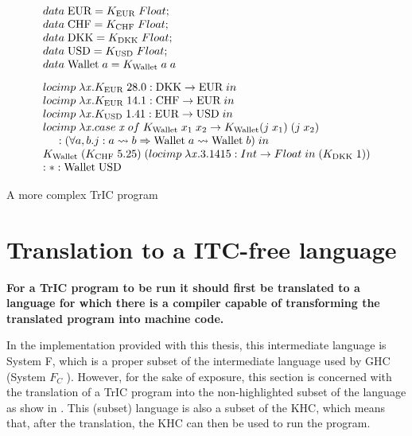 \begin{eg}
     \[
\begin{array}{@{\hspace{0mm}}l@{\hspace{0mm}}}
  data\;\text{EUR}=K_{\text{EUR}}\;Float;\\
  data\;\text{CHF}=K_{\text{CHF}}\;Float;\\
  data\;\text{DKK}=K_{\text{DKK}}\;Float;\\
  data\;\text{USD}=K_{\text{USD}}\;Float;\\
  data\;\text{Wallet}\;a =K_{\text{Wallet}}\;a\;a\\[3mm]
  
  \monolocal{\text{DKK}}{\text{EUR}}{\lambda \tmVar . K_{\text{EUR}}\; 28.0}\\
  \monolocal{\text{CHF}}{\text{EUR}}{\lambda \tmVar . K_{\text{EUR}}\; 14.1}\\
  \monolocal{\text{EUR}}{\text{USD}}{\lambda \tmVar . K_{\text{USD}}\; 1.41}\\
  locimp\;\lambda \tmVar. case\;\tmVar\; of\;K_{\text{Wallet}}\;x_1\;x_2 \to K_{\text{Wallet}} (j\;x_1)\;(j\;x_2)\; \\
  \phantom{xx} :(\forall a, b . j : a \rightsquigarrow b \Rightarrow \text{Wallet}\;a\rightsquigarrow \text{Wallet}\;b)\; in \\
  K_{\text{Wallet}}\;(K_{\text{CHF}}\; 5.25)\;(\monolocal{Int}{Float}{\lambda \tmVar.3.1415} (K_{\text{DKK}}\;1))
  \\
  :*: \text{Wallet} \; \text{USD}
\end{array}
\]
\caption{A more complex TrIC program}
\label{complex5}
\end{eg}

\section{Translation to a ITC-free language}
\textbf{For a TrIC program to be run it should first be translated to a language for which there is a compiler capable of transforming the translated program into machine code.}

In the implementation provided with this thesis, this intermediate language is System F, which is a proper subset of the intermediate language used by GHC (System $F_C$ \cite{fc}). However, for the sake of exposure, this section is concerned with the translation of a TrIC program into the non-highlighted subset of the language as show in . This (subset) language is also a subset of the KHC, which means that, after the translation, the KHC can then be used to run the program.

